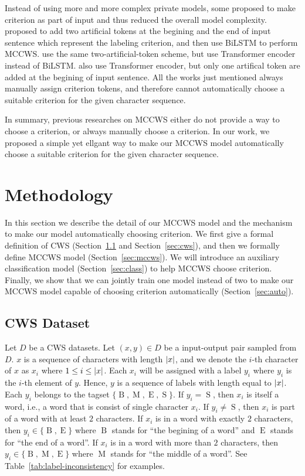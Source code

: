 \documentclass[11pt]{article}
\newcommand{\set}[1]{\lbrace #1 \rbrace}
\newcommand{\BTag}{\operatorname{B}}
\newcommand{\MTag}{\operatorname{M}}
\newcommand{\ETag}{\operatorname{E}}
\newcommand{\STag}{\operatorname{S}}
\newcommand{\TagSet}{\set{\BTag, \MTag, \ETag, \STag}}
\DeclarePairedDelimiter{\abs}{\lvert}{\rvert}
\begin{document}
Instead of using more and more complex private models, some proposed to make criterion as part of input and thus reduced the overall model complexity.
\citep{He-2019-effective} proposed to add two artificial tokens at the begining and the end of input sentence which represent the labeling criterion, and then use BiLSTM to perform MCCWS.
\citep{huang-etal-2020-joint-multiple} use the same two-artificial-token scheme, but use Transformer encoder \citep{vaswani-2017-attention} instead of BiLSTM.
\citep{ke-etal-2021-pre} also use Transformer encoder, but only one artifical token are added at the begining of input sentence.
All the works just mentioned always manually assign criterion tokens, and therefore cannot automatically choose a suitable criterion for the given character sequence.

In summary, previous researches on MCCWS either do not provide a way to choose a criterion, or always manually choose a criterion.
In our work, we proposed a simple yet ellgant way to make our MCCWS model automatically choose a suitable criterion for the given character sequence.

\section{Methodology}

In this section we describe the detail of our MCCWS model and the mechanism to make our model automatically choosing criterion.
We first give a formal definition of CWS (Section~\ref{sec:data} and Section~\ref{sec:cws}), and then we formally define MCCWS model (Section~\ref{sec:mccws}).
We will introduce an auxiliary classification model (Section~\ref{sec:class}) to help MCCWS choose criterion.
Finally, we show that we can jointly train one model instead of two to make our MCCWS model capable of choosing criterion automatically (Section~\ref{sec:auto}).

\subsection{CWS Dataset}\label{sec:data}

Let \(D\) be a CWS datasets.
Let \((x, y) \in D\) be a input-output pair sampled from \(D\).
\(x\) is a sequence of characters with length \(\abs{x}\), and we denote the \(i\)-th character of \(x\) as \(x_i\) where \(1 \leq i \leq \abs{x}\).
Each \(x_i\) will be assigned with a label \(y_i\) where \(y_i\) is the \(i\)-th element of \(y\).
Hence, \(y\) is a sequence of labels with length equal to \(\abs{x}\).
Each \(y_i\) belongs to the tagset \(\TagSet\).
If \(y_i = \STag\), then \(x_i\) is itself a word, i.e., a word that is consist of single character \(x_i\).
If \(y_i \neq \STag\), then \(x_i\) is part of a word with at least \(2\) characters.
If \(x_i\) is in a word with exactly \(2\) characters, then \(y_i \in \set{\BTag, \ETag}\) where \(\BTag\) stands for ``the begining of a word'' and \(\ETag\) stands for ``the end of a word''.
If \(x_i\) is in a word with more than \(2\) characters, then \(y_i \in \set{\BTag, \MTag, \ETag}\) where \(\MTag\) stands for ``the middle of a word''.
See Table~\ref{tab:label-inconsistency} for examples.
\end{document}
